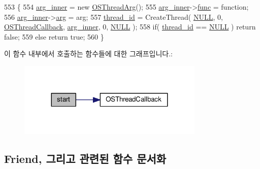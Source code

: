 \begin{DoxyCode}
553                                                                \{
554         \hyperlink{class_windows_thread_af6992b2f52fbe4a2362f1f0a81371185}{arg\_inner} = \textcolor{keyword}{new} \hyperlink{struct_o_s_thread_arg}{OSThreadArg}();
555         \hyperlink{class_windows_thread_af6992b2f52fbe4a2362f1f0a81371185}{arg\_inner}->\hyperlink{struct_o_s_thread_arg_a8eac03f92af0136b0d3570a5fd522d0b}{func} = \textcolor{keyword}{function};
556         \hyperlink{class_windows_thread_af6992b2f52fbe4a2362f1f0a81371185}{arg\_inner}->\hyperlink{struct_o_s_thread_arg_ae036856e415526e58e249638733f6752}{arg} = arg;
557         \hyperlink{class_windows_thread_a9771b03f8c67546b28d7aaad3b8e53ee}{thread\_id} = CreateThread( \hyperlink{openavb__types__base__pub_8h_a070d2ce7b6bb7e5c05602aa8c308d0c4}{NULL}, 0, \hyperlink{windows__hal_8hpp_adba475057f1652394673ed488c9f1c01}{OSThreadCallback}, 
      \hyperlink{class_windows_thread_af6992b2f52fbe4a2362f1f0a81371185}{arg\_inner}, 0, \hyperlink{openavb__types__base__pub_8h_a070d2ce7b6bb7e5c05602aa8c308d0c4}{NULL} );
558         \textcolor{keywordflow}{if}( \hyperlink{class_windows_thread_a9771b03f8c67546b28d7aaad3b8e53ee}{thread\_id} == \hyperlink{openavb__types__base__pub_8h_a070d2ce7b6bb7e5c05602aa8c308d0c4}{NULL} ) \textcolor{keywordflow}{return} \textcolor{keyword}{false};
559         \textcolor{keywordflow}{else} \textcolor{keywordflow}{return} \textcolor{keyword}{true};
560     \}
\end{DoxyCode}


이 함수 내부에서 호출하는 함수들에 대한 그래프입니다.\+:
\nopagebreak
\begin{figure}[H]
\begin{center}
\leavevmode
\includegraphics[width=251pt]{class_windows_thread_affcc04a68e6b3779523a4f1183ba03e9_cgraph}
\end{center}
\end{figure}




\subsection{Friend, 그리고 관련된 함수 문서화}
